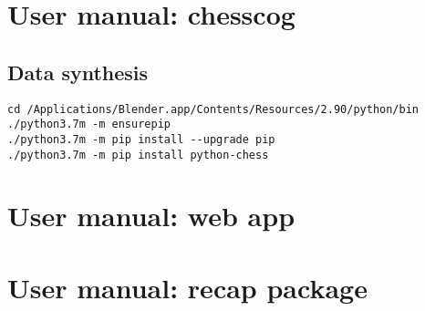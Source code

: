 \documentclass[../../main.tex]{subfiles}
\begin{document}
\chapter{User manual: chesscog}
\label{chap:user_man_chesscog}

\section{Data synthesis}
\begin{verbatim}
cd /Applications/Blender.app/Contents/Resources/2.90/python/bin
./python3.7m -m ensurepip
./python3.7m -m pip install --upgrade pip
./python3.7m -m pip install python-chess
\end{verbatim}

\chapter{User manual: web app}
\label{chap:user_man_chesscogapp}
\chapter{User manual: recap package}
\label{chap:user_man_recap}
\end{document}
